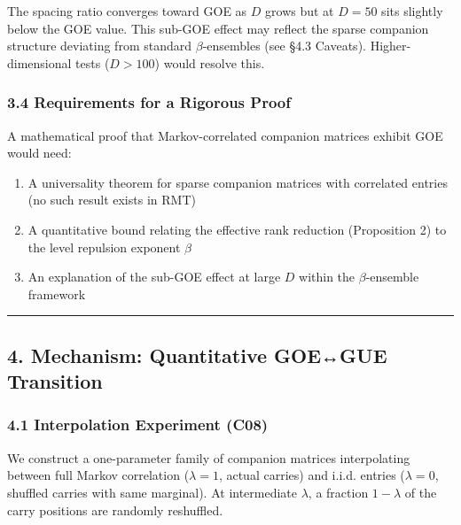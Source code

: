 \documentclass[
  11pt,
]{article}
\providecommand{\tightlist}{%
  \setlength{\itemsep}{0pt}\setlength{\parskip}{0pt}}
\begin{document}
The spacing ratio converges toward GOE as \(D\) grows but at \(D = 50\) sits
slightly below the GOE value. This sub-GOE effect may reflect the sparse
companion structure deviating from standard \(\beta\)-ensembles (see §4.3
Caveats). Higher-dimensional tests (\(D > 100\)) would resolve this.

\subsubsection{3.4 Requirements for a Rigorous
Proof}\label{requirements-for-a-rigorous-proof}

A mathematical proof that Markov-correlated companion matrices exhibit GOE would
need:

\begin{enumerate}
\def\labelenumi{\arabic{enumi}.}
\tightlist
\item
  A universality theorem for sparse companion matrices with correlated entries
  (no such result exists in RMT)
\item
  A quantitative bound relating the effective rank reduction (Proposition 2) to
  the level repulsion exponent \(\beta\)
\item
  An explanation of the sub-GOE effect at large \(D\) within the
  \(\beta\)-ensemble framework
\end{enumerate}

\begin{center}\rule{0.5\linewidth}{0.5pt}\end{center}

\newpage

\subsection{4. Mechanism: Quantitative GOE↔GUE
Transition}\label{mechanism-quantitative-goegue-transition}

\subsubsection{4.1 Interpolation Experiment
(C08)}\label{interpolation-experiment-c08}

We construct a one-parameter family of companion matrices interpolating between
full Markov correlation (\(\lambda = 1\), actual carries) and i.i.d. entries
(\(\lambda = 0\), shuffled carries with same marginal). At intermediate
\(\lambda\), a fraction \(1 - \lambda\) of the carry positions are randomly
reshuffled.
\end{document}
